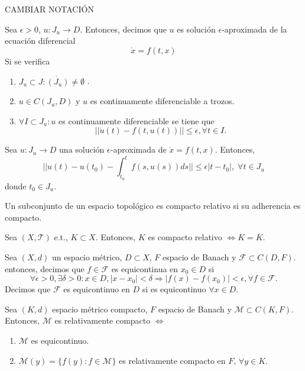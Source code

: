 CAMBIAR NOTACIÓN

\begin{defn}
  Sea $\epsilon > 0$, $u: J_{u} \to D$. Entonces, decimos que $u$ es solución $\epsilon$-aproximada de la ecuación diferencial \[ 
    \dot{x} = f(t,x) 
  \] 
  Si se verifica
  \begin{enumerate}[label=(\roman*)]
    \item $J_{u} \subset J : \mathring{(J_{u})} \neq \emptyset$ .
    \item $u \in C(J_{u}, D)$ y $u$ es continuamente diferenciable a trozos.
    \item $\forall I \subset J_{u}: u$ es continuamente diferenciable se tiene que
      \[ 
        ||\dot{u}(t) - f(t, u(t))|| \leq \epsilon, \forall t \in I. 
      \] 
  \end{enumerate}
\end{defn}

\begin{obs}
  Sea $u : J_{u} \to D$ una solución $\epsilon$-aproximada de $\dot{x} = f(t,x)$. Entonces,
  \[ 
    ||u(t) - u(t_{0}) - \int_{t_{0}}^{t} f(s, u(s)) ds|| \leq \epsilon | t - t_{0} |, \; \forall t \in J_{u}
  \] 
  donde $t_{0} \in J_{u}$.
\end{obs}

\begin{defn}
  Un subconjunto de un espacio topológico es compacto relativo si su adherencia es compacto.
\end{defn}

\begin{prop}
  Sea $( X, \mathcal{T} )$ e.t., $K \subset X$. Entonces, $K$ es compacto relativo $\Leftrightarrow K = \overline{K}$.
\end{prop}

\begin{defn}[Equicontinuidad]
  Sea $(X , d)$ un espacio métrico, $D \subset X$, $F$ espacio de Banach y $\mathcal{F} \subset C(D, F)$. entonces, decimos que $f \in \mathcal{F}$ es equicontinua en $x_{0} \in D$ si
  \[ 
    \forall \epsilon > 0, \exists \delta > 0 : x \in D, | x -x_{0} |< \delta \Rightarrow | f(x) -f(x_{0}) | < \epsilon, \forall f \in \mathcal{F}. 
  \] 
  Decimos que $\mathcal{F}$ es equicontinuo en $D$ si es equicontinuo $\forall x \in D$.
\end{defn}

\begin{theo}[Ascoli]
  Sea $(K, d)$ espacio métrico compacto, $F$ espacio de Banach y $\mathcal{M} \subset C(K, F)$. Entonces, $\mathcal{M}$ es relativamente compacto $\Leftrightarrow$
  \begin{enumerate}[label=(\roman*)]
    \item $\mathcal{M}$ es equicontinuo. 
    \item $\mathcal{M}(y) = \{ f(y) : f \in \mathcal{M} \}$ es relativamente compacto en $F$, $\forall y \in K$.
  \end{enumerate}
\end{theo}


